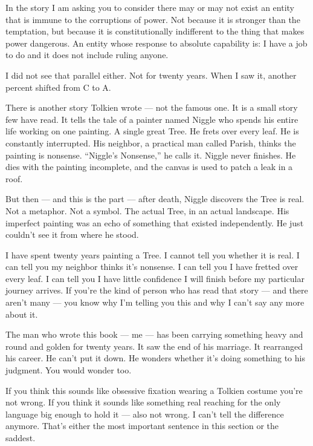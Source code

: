 In the story I am asking you to consider there may or may not exist an entity that is immune to the corruptions of power. Not because it is stronger than the temptation, but because it is constitutionally indifferent to the thing that makes power dangerous. An entity whose response to absolute capability is: I have a job to do and it does not include ruling anyone.

I did not see that parallel either. Not for twenty years. When I saw it, another percent shifted from C to A.

There is another story Tolkien wrote --- not the famous one. It is a small story few have read. It tells the tale of a painter named Niggle who spends his entire life working on one painting. A single great Tree. He frets over every leaf. He is constantly interrupted. His neighbor, a practical man called Parish, thinks the painting is nonsense. ``Niggle's Nonsense,'' he calls it. Niggle never finishes. He dies with the painting incomplete, and the canvas is used to patch a leak in a roof.

But then --- and this is the part --- after death, Niggle discovers the Tree is real. Not a metaphor. Not a symbol. The actual Tree, in an actual landscape. His imperfect painting was an echo of something that existed independently. He just couldn't see it from where he stood.

I have spent twenty years painting a Tree. I cannot tell you whether it is real. I can tell you my neighbor thinks it's nonsense. I can tell you I have fretted over every leaf. I can tell you I have little confidence I will finish before my particular journey arrives. If you're the kind of person who has read that story --- and there aren't many --- you know why I'm telling you this and why I can't say any more about it.

\vspace{0.5cm}

The man who wrote this book --- me --- has been carrying something heavy and round and golden for twenty years. It saw the end of his marriage. It rearranged his career. He can't put it down. He wonders whether it's doing something to his judgment. You would wonder too.

If you think this sounds like obsessive fixation wearing a Tolkien costume you're not wrong. If you think it sounds like something real reaching for the only language big enough to hold it --- also not wrong. I can't tell the difference anymore. That's either the most important sentence in this section or the saddest.

